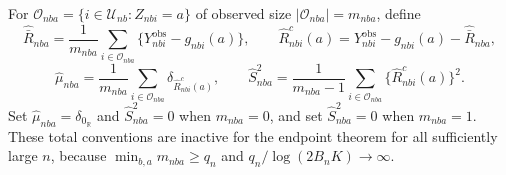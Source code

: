 For \(\mathcal O_{nba}=\{i\in\mathcal U_{nb}:Z_{nbi}=a\}\) of observed size \(|\mathcal O_{nba}|=m_{nba}\), define
\[
\widehat{\bar R}_{nba}=\frac1{m_{nba}}\sum_{i\in\mathcal O_{nba}}\{Y_{nbi}^{\mathrm{obs}}-g_{nbi}(a)\},\qquad \widehat R_{nbi}^{c}(a)=Y_{nbi}^{\mathrm{obs}}-g_{nbi}(a)-\widehat{\bar R}_{nba},
\]
\[
\widehat\mu_{nba}=\frac1{m_{nba}}\sum_{i\in\mathcal O_{nba}}\delta_{\widehat R_{nbi}^{c}(a)},\qquad \widehat S_{nba}^2=\frac1{m_{nba}-1}\sum_{i\in\mathcal O_{nba}}\{\widehat R_{nbi}^{c}(a)\}^2.
\]
Set \(\widehat\mu_{nba}=\delta_{0_{\mathbb R}}\) and \(\widehat S_{nba}^2=0\) when \(m_{nba}=0\), and set \(\widehat S_{nba}^2=0\) when \(m_{nba}=1\). These total conventions are inactive for the endpoint theorem for all sufficiently large \(n\), because \(\min_{b,a}m_{nba}\ge q_n\) and \(q_n/\log(2B_nK)\to\infty\).